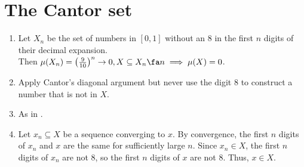 \documentclass{article}
\begin{document}
\section{The Cantor set}
\begin{enumerate}
    \item Let $X_n$ be the set of numbers in $[0, 1]$ without an $8$ in the first $n$ digits of their decimal expansion. \\
    Then $\mu(X_n) = \left(\frac{9}{10}\right)^n \to 0, X \subseteq X_n \fa n \implies \mu(X) = 0$. 
    \item Apply Cantor's diagonal argument but never use the digit $8$ to construct a number that is not in $X$. 
    \item As in .
    \item Let $x_n \subseteq X$ be a sequence converging to $x$. By convergence, the first $n$ digits of $x_n$ and $x$ are the same for sufficiently large $n$. Since $x_n \in X$, the first $n$ digits of $x_n$ are not $8$, so the first $n$ digits of $x$ are not $8$. Thus, $x \in X$.
\end{enumerate}
\end{document}
